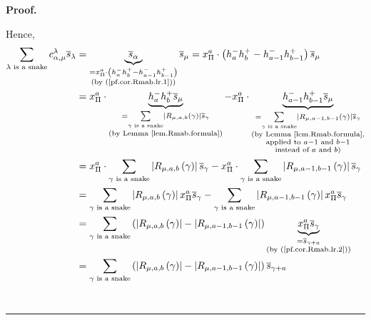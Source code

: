 \documentclass[numbers=enddot,12pt,final,onecolumn,notitlepage]{scrartcl}%
\theoremstyle{definition}
\newenvironment{proof}[1][Proof]{\noindent\textbf{#1.} }{\ \rule{0.5em}{0.5em}}
\let\sumnonlimits\sum
\renewcommand{\sum}{\sumnonlimits\limits}
\newenvironment{verlong}{}{}
\newenvironment{vershort}{}{}
\begin{document}
\begin{proof}
\begin{vershort}
\end{vershort}

\begin{verlong}
\noindent Hence,%
\begin{align*}
\sum_{\lambda\text{ is a snake}}c_{\alpha,\mu}^{\lambda}\overline{s}%
_{\lambda}  &  =\underbrace{\overline{s}_{\alpha}}_{\substack{=x_{\Pi}%
^{a}\cdot\left(  h_{a}^{-}h_{b}^{+}-h_{a-1}^{-}h_{b-1}^{+}\right)  \\\text{(by
(\ref{pf.cor.Rmab.lr.1}))}}}\overline{s}_{\mu}=x_{\Pi}^{a}\cdot\left(
h_{a}^{-}h_{b}^{+}-h_{a-1}^{-}h_{b-1}^{+}\right)  \overline{s}_{\mu}\\
&  =x_{\Pi}^{a}\cdot\underbrace{h_{a}^{-}h_{b}^{+}\overline{s}_{\mu}%
}_{\substack{=\sum_{\gamma\text{ is a snake}}\left\vert R_{\mu,a,b}\left(
\gamma\right)  \right\vert \overline{s}_{\gamma}\\\text{(by Lemma
\ref{lem.Rmab.formula})}}}-x_{\Pi}^{a}\cdot\underbrace{h_{a-1}^{-}h_{b-1}%
^{+}\overline{s}_{\mu}}_{\substack{=\sum_{\gamma\text{ is a snake}}\left\vert
R_{\mu,a-1,b-1}\left(  \gamma\right)  \right\vert \overline{s}_{\gamma
}\\\text{(by Lemma \ref{lem.Rmab.formula},}\\\text{applied to }a-1\text{ and
}b-1\\\text{instead of }a\text{ and }b\text{)}}}\\
&  =x_{\Pi}^{a}\cdot\sum_{\gamma\text{ is a snake}}\left\vert R_{\mu
,a,b}\left(  \gamma\right)  \right\vert \overline{s}_{\gamma}-x_{\Pi}^{a}%
\cdot\sum_{\gamma\text{ is a snake}}\left\vert R_{\mu,a-1,b-1}\left(
\gamma\right)  \right\vert \overline{s}_{\gamma}\\
&  =\sum_{\gamma\text{ is a snake}}\left\vert R_{\mu,a,b}\left(
\gamma\right)  \right\vert x_{\Pi}^{a}\overline{s}_{\gamma}-\sum_{\gamma\text{
is a snake}}\left\vert R_{\mu,a-1,b-1}\left(  \gamma\right)  \right\vert
x_{\Pi}^{a}\overline{s}_{\gamma}\\
&  =\sum_{\gamma\text{ is a snake}}\left(  \left\vert R_{\mu,a,b}\left(
\gamma\right)  \right\vert -\left\vert R_{\mu,a-1,b-1}\left(  \gamma\right)
\right\vert \right)  \underbrace{x_{\Pi}^{a}\overline{s}_{\gamma}%
}_{\substack{=\overline{s}_{\gamma+a}\\\text{(by (\ref{pf.cor.Rmab.lr.2}))}%
}}\\
&  =\sum_{\gamma\text{ is a snake}}\left(  \left\vert R_{\mu,a,b}\left(
\gamma\right)  \right\vert -\left\vert R_{\mu,a-1,b-1}\left(  \gamma\right)
\right\vert \right)  \overline{s}_{\gamma+a}\\

\end{align*}
\end{verlong}
\end{proof}
\end{document}
